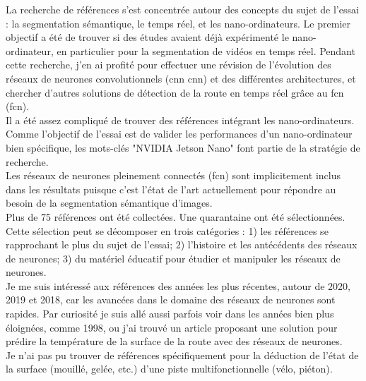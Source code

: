 ﻿\noindent La recherche de références s'est concentrée autour des concepts du sujet de l'essai : la segmentation sémantique, le temps réel, et les nano-ordinateurs. Le premier objectif a été de trouver si des études avaient déjà expérimenté le nano-ordinateur, en particulier pour la segmentation de vidéos en temps réel. Pendant cette recherche, j'en ai profité pour effectuer une révision de l'évolution des réseaux de neurones convolutionnels (\acrshort{cnn} \acrlong{cnn}) et des différentes architectures, et chercher d'autres solutions de détection de la route en temps réel grâce au \acrlong{fcn} (\acrshort{fcn}). 
\vspace{0.5\baselineskip}
\\
\noindent Il a été assez compliqué de trouver des références intégrant les nano-ordinateurs. Comme l'objectif de l'essai est de valider les performances d'un nano-ordinateur bien spécifique, les mots-clés "NVIDIA Jetson Nano" font partie de la stratégie de recherche. 
\vspace{0.5\baselineskip}
\\
\noindent Les réseaux de neurones pleinement connectés (\acrshort{fcn}) sont implicitement inclus dans les résultats puisque c'est l'état de l'art actuellement pour répondre au besoin de la segmentation sémantique d'images.
\vspace{0.5\baselineskip}
\\
\noindent Plus de 75 références ont été collectées. Une quarantaine ont été sélectionnées. Cette sélection peut se décomposer en trois catégories : 1) les références se rapprochant le plus du sujet de l'essai; 2) l'histoire et les antécédents des réseaux de neurones; 3) du matériel éducatif pour étudier et manipuler les réseaux de neurones.
\vspace{0.5\baselineskip}
\\
\noindent Je me suis intéressé aux références des années les plus récentes, autour de 2020, 2019 et 2018, car les avancées dans le domaine des réseaux de neurones sont rapides. Par curiosité je suis allé aussi parfois voir dans les années bien plus éloignées, comme 1998, ou j'ai trouvé un article proposant une solution pour prédire la température de la surface de la route avec des réseaux de neurones.
\vspace{0.5\baselineskip}
\\
\noindent Je n'ai pas pu trouver de références spécifiquement pour la déduction de l'état de la surface (mouillé, gelée, etc.) d'une piste multifonctionnelle (vélo, piéton).
